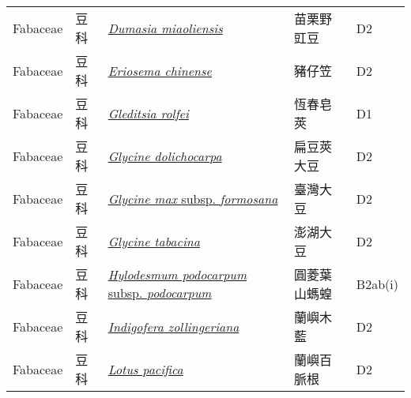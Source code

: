 {\begin{longtable}{L{2.5cm}L{2cm}L{5cm}L{2.5cm}L{3cm}}
    Fabaceae & 豆科 & \href{http://www.theplantlist.org/tpl1.1/search?q=Dumasia+miaoliensis}{\textit{Dumasia miaoliensis} } & 苗栗野豇豆 & D2    \\
    Fabaceae & 豆科 & \href{http://www.theplantlist.org/tpl1.1/search?q=Eriosema+chinense}{\textit{Eriosema chinense} } & 豬仔笠 & D2    \\
    Fabaceae & 豆科 & \href{http://www.theplantlist.org/tpl1.1/search?q=Gleditsia+rolfei}{\textit{Gleditsia rolfei} } & 恆春皂莢 & D1    \\
    Fabaceae & 豆科 & \href{http://www.theplantlist.org/tpl1.1/search?q=Glycine+dolichocarpa}{\textit{Glycine dolichocarpa} } & 扁豆莢大豆 & D2    \\
    Fabaceae & 豆科 & \href{http://www.theplantlist.org/tpl1.1/search?q=Glycine+max+subsp.+formosana}{\textit{Glycine max} subsp. \textit{formosana} } & 臺灣大豆 & D2    \\
    Fabaceae & 豆科 & \href{http://www.theplantlist.org/tpl1.1/search?q=Glycine+tabacina}{\textit{Glycine tabacina} } & 澎湖大豆 & D2    \\
    Fabaceae & 豆科 & \href{http://www.theplantlist.org/tpl1.1/search?q=Hylodesmum+podocarpum+subsp.+podocarpum}{\textit{Hylodesmum podocarpum} subsp. \textit{podocarpum} } & 圓菱葉山螞蝗 & B2ab(i)    \\
    Fabaceae & 豆科 & \href{http://www.theplantlist.org/tpl1.1/search?q=Indigofera+zollingeriana}{\textit{Indigofera zollingeriana} } & 蘭嶼木藍 & D2    \\
    Fabaceae & 豆科 & \href{http://www.theplantlist.org/tpl1.1/search?q=Lotus+pacifica}{\textit{Lotus pacifica} } & 蘭嶼百脈根 & D2    \\

\end{longtable}}

